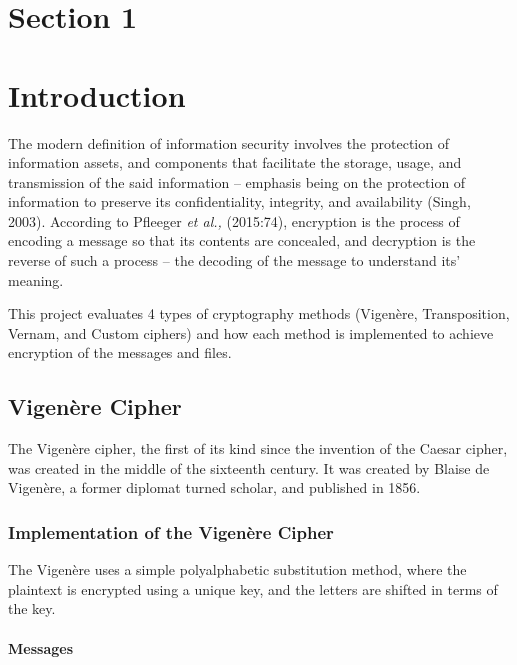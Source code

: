 \section*{\huge Section 1}
\section{Introduction}

The modern definition of information security involves the protection of information assets, and components that facilitate the storage, usage, and transmission of the said information – emphasis being on the protection of information to preserve its confidentiality, integrity, and availability (Singh, 2003).
According to Pfleeger \emph{et al.,} (2015:74), encryption is the process of encoding a message so that its contents are concealed, and decryption is the reverse of such a process – the decoding of the message to understand its’ meaning. 

This project evaluates 4 types of cryptography methods (Vigenère, Transposition, Vernam, and Custom ciphers) and how each method is implemented to achieve encryption of the messages and files.

\subsection{Vigenère Cipher}
The Vigenère cipher, the first of its kind since the invention of the Caesar cipher, was created in the middle of the sixteenth century. It was created by Blaise de Vigenère, a former diplomat turned scholar, and published in 1856.
 
\subsubsection{Implementation of the Vigenère Cipher}
The Vigenère uses a simple polyalphabetic substitution method, where the plaintext is encrypted using a unique key, and the letters are shifted in terms of the key.
  
\paragraph{Messages\\}

